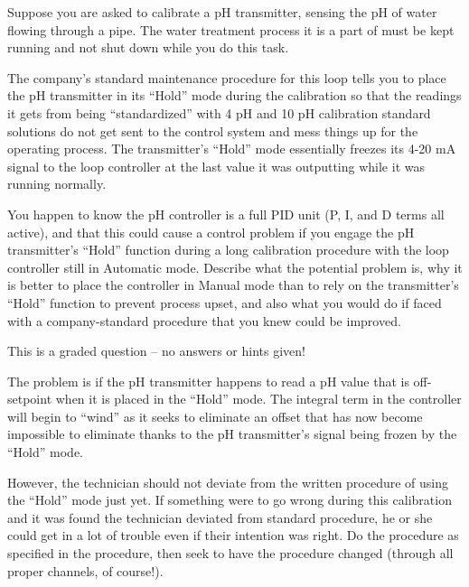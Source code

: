 

Suppose you are asked to calibrate a pH transmitter, sensing the pH of water flowing through a pipe.  The water treatment process it is a part of must be kept running and not shut down while you do this task.  

The company's standard maintenance procedure for this loop tells you to place the pH transmitter in its ``Hold'' mode during the calibration so that the readings it gets from being ``standardized'' with 4 pH and 10 pH calibration standard solutions do not get sent to the control system and mess things up for the operating process.  The transmitter's ``Hold'' mode essentially freezes its 4-20 mA signal to the loop controller at the last value it was outputting while it was running normally.

\vskip 10pt

You happen to know the pH controller is a full PID unit (P, I, and D terms all active), and that this could cause a control problem if you engage the pH transmitter's ``Hold'' function during a long calibration procedure with the loop controller still in Automatic mode.  Describe what the potential problem is, why it is better to place the controller in Manual mode than to rely on the transmitter's ``Hold'' function to prevent process upset, and also what you would do if faced with a company-standard procedure that you knew could be improved.

\vfil

\eject






This is a graded question -- no answers or hints given!







The problem is if the pH transmitter happens to read a pH value that is off-setpoint when it is placed in the ``Hold'' mode.  The integral term in the controller will begin to ``wind'' as it seeks to eliminate an offset that has now become impossible to eliminate thanks to the pH transmitter's signal being frozen by the ``Hold'' mode.

However, the technician should not deviate from the written procedure of using the ``Hold'' mode just yet.  If something were to go wrong during this calibration and it was found the technician deviated from standard procedure, he or she could get in a lot of trouble even if their intention was right.  Do the procedure as specified in the procedure, then seek to have the procedure changed (through all proper channels, of course!).




